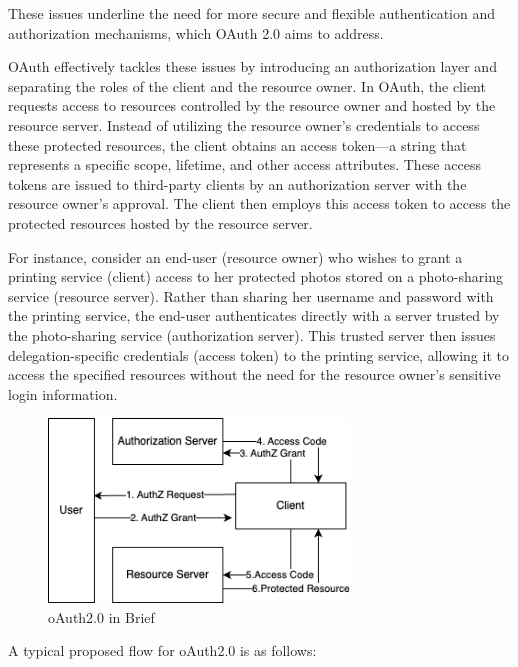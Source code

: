These issues underline the need for more secure and flexible authentication and authorization mechanisms, which OAuth 2.0 aims to address.
\par

OAuth effectively tackles these issues by introducing an authorization layer and separating the roles of the client and the resource owner. In OAuth, the client requests access to resources controlled by the resource owner and hosted by the resource server. Instead of utilizing the resource owner's credentials to access these protected resources, the client obtains an access token—a string that represents a specific scope, lifetime, and other access attributes. These access tokens are issued to third-party clients by an authorization server with the resource owner's approval. The client then employs this access token to access the protected resources hosted by the resource server.
\par
For instance, consider an end-user (resource owner) who wishes to grant a printing service (client) access to her protected photos stored on a photo-sharing service (resource server). Rather than sharing her username and password with the printing service, the end-user authenticates directly with a server trusted by the photo-sharing service (authorization server). This trusted server then issues delegation-specific credentials (access token) to the printing service, allowing it to access the specified resources without the need for the resource owner's sensitive login information.
\par
\par
\begin{figure}
        
        \includegraphics[width=8cm]{images/oauth.drawio.png}
        \centering
        \caption{oAuth2.0 in Brief}
        \label{fig:my_label}
    \end{figure}
A typical proposed flow for oAuth2.0 is as follows:
